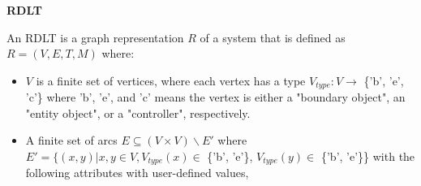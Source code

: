 \documentclass[12pt]{article}
\begin{document}
        \begin{definition} \textbf{RDLT} \cite{malinao-rdlt}
        
        An RDLT is a graph representation \begin{math}R\end{math} of a system that is defined as \begin{math}R = (V, E, T, M)\end{math} where:

            \begin{itemize}
            
                \item \begin{math}V\end{math} is a finite set of vertices, where each vertex has a type \begin{math}V_{type}: V \rightarrow \end{math} \{'b', 'e', 'c'\} where 'b', 'e', and 'c' means the vertex is either a "boundary object", an "entity object", or a "controller", respectively.
                
                \item A finite set of arcs \begin{math}E \subseteq (V \times V) \backslash  E'\end{math} where \begin{math}E' = \{(x,y) | x,y \in V, V_{type}(x) \in \end{math} \{'b', 'e'\}, \begin{math}V_{type}(y) \in \end{math} \{'b', 'e'\}\} with the following attributes with user-defined values,
                
                \begin{itemize}
                    

\end{itemize}
\end{itemize}
\end{definition}
\end{document}
